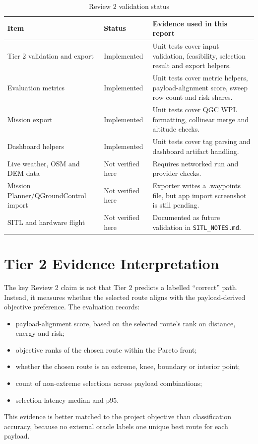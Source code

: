 \documentclass{ssnreview}
\begin{document}
\begin{table}[H]
\centering
\caption{Review 2 validation status}
\label{tab:validation}
\begin{tabularx}{\textwidth}{p{}p{}X}
\toprule
\textbf{Item} & \textbf{Status} & \textbf{Evidence used in this report} \\
\midrule
Tier 2 validation and export & Implemented & Unit tests cover input validation, feasibility, selection result and export helpers. \\
\addlinespace
Evaluation metrics & Implemented & Unit tests cover metric helpers, payload-alignment score, sweep row count and risk shares. \\
\addlinespace
Mission export & Implemented & Unit tests cover QGC WPL formatting, collinear merge and altitude checks. \\
\addlinespace
Dashboard helpers & Implemented & Unit tests cover tag parsing and dashboard artifact handling. \\
\addlinespace
Live weather, OSM and DEM data & Not verified here & Requires networked run and provider checks. \\
\addlinespace
Mission Planner/QGroundControl import & Not verified here & Exporter writes a .waypoints file, but app import screenshot is still pending. \\
\addlinespace
SITL and hardware flight & Not verified here & Documented as future validation in \texttt{SITL\_NOTES.md}. \\
\bottomrule
\end{tabularx}
\end{table}

\section{Tier 2 Evidence Interpretation}
The key Review 2 claim is not that Tier 2 predicts a labelled ``correct'' path. Instead, it measures whether the
selected route aligns with the payload-derived objective preference. The evaluation records:
\begin{itemize}
  \item payload-alignment score, based on the selected route's rank on distance, energy and risk;
  \item objective ranks of the chosen route within the Pareto front;
  \item whether the chosen route is an extreme, knee, boundary or interior point;
  \item count of non-extreme selections across payload combinations;
  \item selection latency median and p95.
\end{itemize}
This evidence is better matched to the project objective than classification accuracy, because no external oracle
labels one unique best route for each payload.
\end{document}
